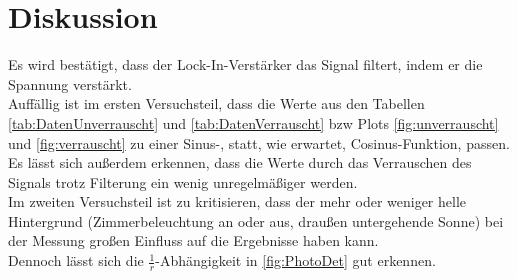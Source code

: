 \section{Diskussion}
\label{sec:Diskussion}
Es wird bestätigt, dass der Lock-In-Verstärker das Signal filtert, indem er die Spannung verstärkt. \\

Auffällig ist im ersten Versuchsteil, dass die Werte aus den Tabellen \ref{tab:DatenUnverrauscht} und 
\ref{tab:DatenVerrauscht} bzw Plots \ref{fig:unverrauscht} und \ref{fig:verrauscht} zu einer 
Sinus-, statt, wie erwartet, Cosinus-Funktion, passen. \\

Es lässt sich außerdem erkennen, dass die Werte durch das Verrauschen des Signals trotz Filterung ein wenig unregelmäßiger werden. \\
Im zweiten Versuchsteil ist zu kritisieren, dass der mehr oder weniger helle Hintergrund (Zimmerbeleuchtung an oder aus, draußen untergehende Sonne) bei der Messung großen Einfluss auf die Ergebnisse haben kann.\\
Dennoch lässt sich die $\frac{1}{r}$-Abhängigkeit in \autoref{fig:PhotoDet} gut erkennen. \\